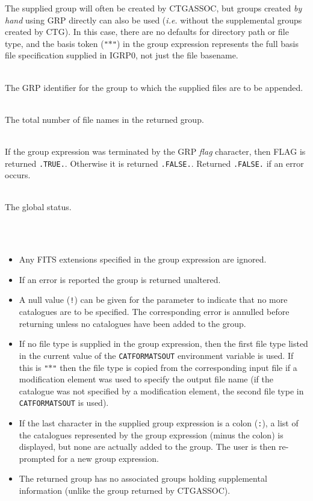 \documentclass[twoside,11pt]{article}
\newcommand{\htmlref}[2]{#1}
\renewcommand{\_}{\texttt{\symbol{95}}}
\newcommand{\sstsubsection}[1]{ \item[{#1}] \mbox{} \\}
\newcommand{\sstnotes}[1]{\item[Notes:] \mbox{} \\[1.3ex] #1}
\newcommand{\sstitemlist}[1]{
  \mbox{} \\
  \vspace{-3.5ex}
  \begin{itemize}
     #1
  \end{itemize}
}
\newcommand{\sstitem}{\item}
\newcommand{\sstsubsection}[1]{\item[{#1}]}
\newcommand{\sstnotes}[1]{\item[Notes:] #1 }
\newcommand{\sstitemlist}[1]{
      \begin{itemize}
         #1
      \end{itemize}
      \\
   }
\newcommand{\sstitem}{\item}
\begin{document}
{{{{         }
         The supplied group will often be created by \htmlref{CTG\_ASSOC}{CTG_ASSOC}, but
         groups created \emph{by hand} using GRP directly can also be used
         (\emph{i.e.} without the supplemental groups created by CTG). In
         this case, there are no defaults for directory path or file type,
         and the basis token ({\tt "$*$"}) in the group expression represents the
         full basis file specification supplied in IGRP0, not just the file
         basename.
      }
      \sstsubsection{
         IGRP = INTEGER (Given and Returned)
      }{
         The GRP identifier for the group to which the supplied
         files are to be appended.
      }
      \sstsubsection{
         SIZE = INTEGER (Returned)
      }{
         The total number of file names in the returned group.
      }
      \sstsubsection{
         FLAG = LOGICAL (Returned)
      }{
         If the group expression was terminated by the GRP \emph{flag}
         character, then FLAG is returned {\tt .TRUE.}. Otherwise it is
         returned {\tt .FALSE.}. Returned {\tt .FALSE.} if an error occurs.
      }
      \sstsubsection{
         STATUS = INTEGER (Given and Returned)
      }{
         The global status.
      }
   }
   \sstnotes{
      \sstitemlist{

         \sstitem
         Any FITS extensions specified in the group expression are ignored.

         \sstitem
         If an error is reported the group is returned unaltered.

         \sstitem
         A null value ({\tt !}) can be given for the parameter to indicate
         that no more catalogues are to be specified. The corresponding error
         is annulled before returning unless no catalogues have been added to
         the group.

         \sstitem
         If no file type is supplied in the group expression, then the first
         file type listed in the current value of the {\tt CAT\_FORMATS\_OUT} environment
         variable is used. If this is {\tt "$*$"} then the file type is copied from the
         corresponding input file if a modification element was used to specify
         the output file name (if the catalogue was not specified by a
         modification element, the second file type in {\tt CAT\_FORMATS\_OUT} is
         used).

         \sstitem
         If the last character in the supplied group expression is
         a colon ({\tt :}), a list of the catalogues represented by the group
         expression (minus the colon) is displayed, but none are
         actually added to the group. The user is then re-prompted for
         a new group expression.

         \sstitem
         The returned group has no associated groups holding supplemental
         information (unlike the group returned by \htmlref{CTG\_ASSOC}{CTG_ASSOC}).
      }
   }
}
\end{document}
